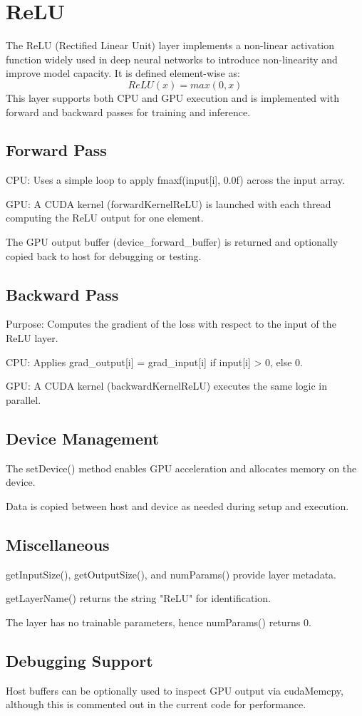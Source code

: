 \section{ReLU}

The ReLU (Rectified Linear Unit) layer implements a non-linear activation function widely used in deep neural networks to introduce non-linearity and improve model capacity. It is defined element-wise as:
$$ReLU(x) = max(0,x)$$
This layer supports both CPU and GPU execution and is implemented with forward and backward passes for training and inference.

\subsection{Forward Pass}
CPU: Uses a simple loop to apply fmaxf(input[i], 0.0f) across the input array.

GPU: A CUDA kernel (forwardKernelReLU) is launched with each thread computing the ReLU output for one element.

The GPU output buffer (device_forward_buffer) is returned and optionally copied back to host for debugging or testing.

\subsection{Backward Pass}
Purpose: Computes the gradient of the loss with respect to the input of the ReLU layer.

CPU: Applies grad_output[i] = grad_input[i] if input[i] > 0, else 0.

GPU: A CUDA kernel (backwardKernelReLU) executes the same logic in parallel.

\subsection{Device Management}
The setDevice() method enables GPU acceleration and allocates memory on the device.

Data is copied between host and device as needed during setup and execution.

\subsection{Miscellaneous}
getInputSize(), getOutputSize(), and numParams() provide layer metadata.

getLayerName() returns the string "ReLU" for identification.

The layer has no trainable parameters, hence numParams() returns 0.

\subsection{Debugging Support}
Host buffers can be optionally used to inspect GPU output via cudaMemcpy, although this is commented out in the current code for performance.